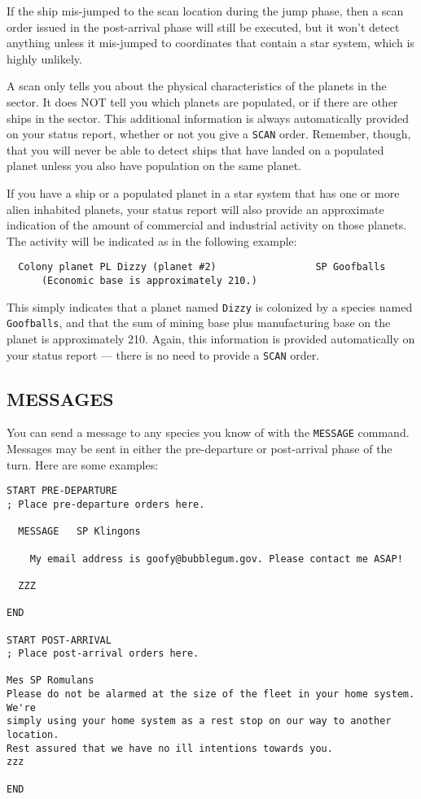 \documentclass[10pt,titlepage]{article}
\begin{document}
If the ship mis-jumped to the scan location during the jump phase, then a scan
order issued in the post-arrival phase will still be executed, but it won't
detect anything unless it mis-jumped to coordinates that contain a star system,
which is highly unlikely.

A scan only tells you about the physical characteristics of the planets in
the sector.  It does NOT tell you which planets are populated, or if there are
other ships in the sector.  This additional information is always automatically
provided on your status report, whether or not you give a \texttt{SCAN} order.
Remember, though, that you will never be able to detect ships that have landed
on a populated planet unless you also have population on the same planet.

If you have a ship or a populated planet in a star system that has one or more
alien inhabited planets, your status report will also provide an approximate
indication of the amount of commercial and industrial activity on those
planets.  The activity will be indicated as in the following example:

\begin{verbatim}
  Colony planet PL Dizzy (planet #2)                 SP Goofballs
      (Economic base is approximately 210.)\end{verbatim} 

This simply indicates that a planet named \texttt{Dizzy} is colonized by a species
named \texttt{Goofballs}, and that the sum of mining base plus manufacturing base
on the planet is approximately 210.  Again, this information is provided
automatically on your status report --- there is no need to provide a \texttt{SCAN}
order.


\subsection{MESSAGES}
\label{sec:messages}


You can send a message to any species you know of with the \texttt{MESSAGE} command.
Messages may be sent in either the pre-departure or post-arrival phase of
the turn.  Here are some examples:

\begin{verbatim}
START PRE-DEPARTURE
; Place pre-departure orders here.

  MESSAGE	SP Klingons

    My email address is goofy@bubblegum.gov. Please contact me ASAP!

  ZZZ

END

START POST-ARRIVAL
; Place post-arrival orders here.

Mes SP Romulans
Please do not be alarmed at the size of the fleet in your home system. We're
simply using your home system as a rest stop on our way to another location.
Rest assured that we have no ill intentions towards you.
zzz

END
\end{verbatim} 
\end{document}
